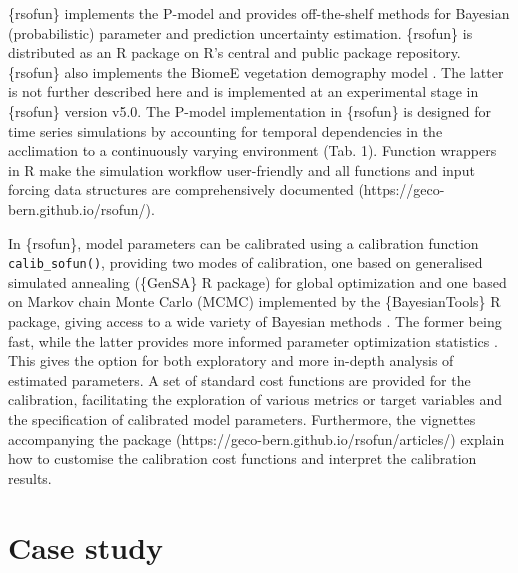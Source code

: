 \documentclass[gmd, manuscript]{copernicus}
\begin{document}
\{rsofun\} implements the P-model \citep{stocker2020} and provides off-the-shelf methods for Bayesian (probabilistic) parameter and prediction uncertainty estimation. \{rsofun\} is distributed as an R package on R's central and public package repository. \{rsofun\} also implements the BiomeE vegetation demography model \citep{weng2019, weng2015}. The latter is not further described here and is implemented at an experimental stage in \{rsofun\} version v5.0. The P-model implementation in \{rsofun\} is designed for time series simulations by accounting for temporal dependencies in the acclimation to a continuously varying environment (Tab. 1). Function wrappers in R make the simulation workflow user-friendly and all functions and input forcing data structures are comprehensively documented (https://geco-bern.github.io/rsofun/).

In \{rsofun\}, model parameters can be calibrated using a calibration function \texttt{calib\_sofun()}, providing two modes of calibration, one based on generalised simulated annealing (\{GenSA\} R package) for global optimization \citep{xiang2013} and one based on Markov chain Monte Carlo (MCMC) implemented by the \{BayesianTools\} R package, giving access to a wide variety of Bayesian methods \citep{hartig2023}. The former being fast, while the latter provides more informed parameter optimization statistics \citep{clark2004, dietze2013}. This gives the option for both exploratory and more in-depth analysis of estimated parameters. A set of standard cost functions are provided for the calibration, facilitating the exploration of various metrics or target variables and the specification of calibrated model parameters. Furthermore, the vignettes accompanying the package (https://geco-bern.github.io/rsofun/articles/) explain how to customise the calibration cost functions and interpret the calibration results.

\section{Case study}
\end{document}
